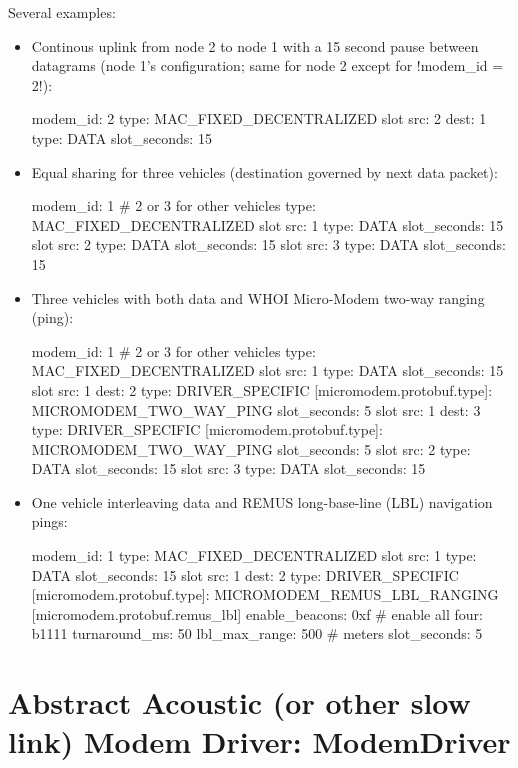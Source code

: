 Several examples:
\begin{itemize}
\item Continous uplink from node 2 to node 1 with a 15 second pause between datagrams (node 1's configuration; same for node 2 except for !modem_id = 2!):
\begin{boxedverbatim}
modem_id: 2
type: MAC_FIXED_DECENTRALIZED
slot { src: 2  dest: 1  type: DATA  slot_seconds: 15 }
\end{boxedverbatim}
\resetbvlinenumber
\item Equal sharing for three vehicles (destination governed by next data packet):
\begin{boxedverbatim}
modem_id: 1 # 2 or 3 for other vehicles
type: MAC_FIXED_DECENTRALIZED
slot { src: 1  type: DATA  slot_seconds: 15 }
slot { src: 2  type: DATA  slot_seconds: 15 }
slot { src: 3  type: DATA  slot_seconds: 15 }
\end{boxedverbatim}
\resetbvlinenumber
\item Three vehicles with both data and WHOI Micro-Modem two-way ranging (ping):
\begin{boxedverbatim}
modem_id: 1 # 2 or 3 for other vehicles
type: MAC_FIXED_DECENTRALIZED
slot { src: 1  type: DATA  slot_seconds: 15 }
slot { 
  src: 1
  dest: 2
  type: DRIVER_SPECIFIC 
  [micromodem.protobuf.type]: MICROMODEM_TWO_WAY_PING
  slot_seconds: 5
}
slot { 
  src: 1
  dest: 3
  type: DRIVER_SPECIFIC 
  [micromodem.protobuf.type]: MICROMODEM_TWO_WAY_PING
  slot_seconds: 5
}
slot { src: 2  type: DATA  slot_seconds: 15 }
slot { src: 3  type: DATA  slot_seconds: 15 }
\end{boxedverbatim}
\resetbvlinenumber
\item One vehicle interleaving data and REMUS long-base-line (LBL) navigation pings:
\begin{boxedverbatim}
modem_id: 1
type: MAC_FIXED_DECENTRALIZED
slot { src: 1  type: DATA  slot_seconds: 15 }
slot { 
  src: 1
  dest: 2
  type: DRIVER_SPECIFIC 
  [micromodem.protobuf.type]: MICROMODEM_REMUS_LBL_RANGING
  [micromodem.protobuf.remus_lbl] {
    enable_beacons: 0xf   # enable all four: b1111
    turnaround_ms: 50
    lbl_max_range: 500 # meters
  }
  slot_seconds: 5
}
\end{boxedverbatim}
\resetbvlinenumber
\end{itemize}

\section{Abstract Acoustic (or other slow link) Modem Driver: ModemDriver} \label{sec:driver}

